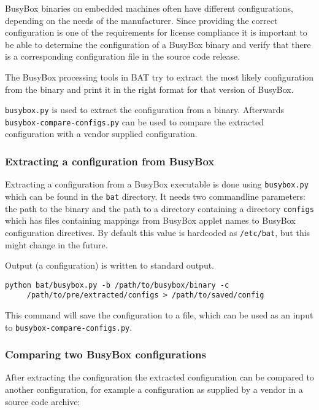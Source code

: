 \documentclass[10pt]{article}
\begin{document}
BusyBox binaries on embedded machines often have different configurations,
depending on the needs of the manufacturer. Since providing the correct
configuration is one of the requirements for license compliance it is important
to be able to determine the configuration of a BusyBox binary and verify that
there is a corresponding configuration file in the source code release.

The BusyBox processing tools in BAT try to extract the most likely
configuration from the binary and print it in the right format for that version
of BusyBox.

\texttt{busybox.py} is used to extract the configuration from a binary.
Afterwards \texttt{busybox-compare-configs.py} can be used to compare the
extracted configuration with a vendor supplied configuration.

\subsubsection{Extracting a configuration from BusyBox}

Extracting a configuration from a BusyBox executable is done using
\texttt{busybox.py} which can be found in the \texttt{bat} directory. It needs
two commandline parameters: the path to the binary and the path to a directory
containing a directory \texttt{configs} which has files containing mappings
from BusyBox applet names to BusyBox configuration directives. By default this
value is hardcoded as \texttt{/etc/bat}, but this might change in the future.

Output (a configuration) is written to standard output.

\begin{verbatim}
python bat/busybox.py -b /path/to/busybox/binary -c
     /path/to/pre/extracted/configs > /path/to/saved/config
\end{verbatim}

This command will save the configuration to a file, which can be used as an
input to \texttt{busybox-compare-configs.py}.

\subsubsection{Comparing two BusyBox configurations}

After extracting the configuration the extracted configuration can be compared
to another configuration, for example a configuration as supplied by a vendor
in a source code archive:
\end{document}
